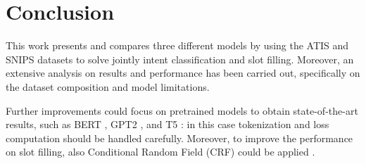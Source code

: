 \documentclass[a4paper]{article}
\begin{document}
\section{Conclusion}
This work presents and compares three different models by using the ATIS and SNIPS datasets to solve jointly intent classification and slot filling. Moreover, an extensive analysis on results and performance has been carried out, specifically on the dataset composition and model limitations.

Further improvements could focus on pretrained models to obtain state-of-the-art results, such as BERT \cite{DBLP:journals/corr/abs-1810-04805}, GPT2 \cite{Radford2019LanguageMA}, and T5 \cite{DBLP:journals/corr/abs-1910-10683}: in this case tokenization and loss computation should be handled carefully. Moreover, to improve the performance on slot filling, also Conditional Random Field (CRF) could be applied \cite{DBLP:journals/corr/HuangXY15}.



\end{document}
